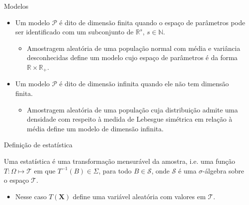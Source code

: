 \documentclass[11pt]{beamer}
\newenvironment{halfwideitemize}{\itemize\addtolength{\itemsep}{0.5em}}{\enditemize}
\begin{document}
	
	\begin{frame}{Modelos}
	\begin{itemize}
		\item Um modelo $\mathcal{P}$ é dito de {\color{blue}dimensão finita} quando o espaço de parâmetros pode ser identificado com um subconjunto de $\mathbb{R}^s$, $ s\in \mathbb{N}$.
		\begin{itemize}
			\item Amostragem aleatória de uma população normal com média e variância desconhecidas define um modelo cujo espaço de parâmetros é da forma $\mathbb{R}\times \mathbb{R}_+$.
		\end{itemize}
				\item Um modelo $\mathcal{P}$ é dito de {\color{blue}dimensão infinita} quando ele não tem dimensão finita.
		\begin{itemize}
			\item Amostragem aleatória de uma população cuja distribuição admite uma densidade com respeito à medida de Lebesgue simétrica em relação à média define um modelo de dimensão infinita.
		\end{itemize}
		
	\end{itemize}
	\end{frame}
	\begin{frame}{Definição de estatística}
		\begin{halfwideitemize}
			
			\item Uma {\color{blue}estatística} é uma transformação mensurável da amostra, i.e. uma função $T:\Omega \mapsto \mathcal{T}$ em que $T^{-1}(B) \in \Sigma$,  para todo  $B \in \mathcal{S}$, onde $\mathcal{S}$ é uma $\sigma$-álgebra sobre o espaço $\mathcal{T}$.
			\begin{itemize}
				\item Nesse caso $T(\boldsymbol{X})$ define uma variável aleatória com valores em $\mathcal{T}$.
			\end{itemize}
		
		\end{halfwideitemize}
	\end{frame}
	
\end{document}
